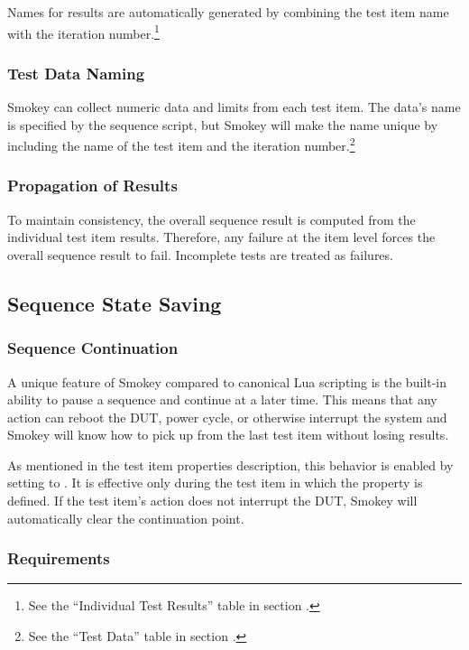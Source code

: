 Names for results are automatically generated by combining the test item name
with the iteration number.\footnote{See the ``Individual Test Results'' table
in section .}

\subsubsection{Test Data Naming}

Smokey can collect numeric data and limits from each test item.  The data's
name is specified by the sequence script, but Smokey will make the name unique
by including the name of the test item and the iteration number.\footnote{See
the ``Test Data'' table in section .}

\subsubsection{Propagation of Results}

To maintain consistency, the overall sequence result is computed from the
individual test item results.  Therefore, any failure at the item level forces
the overall sequence result to fail.  Incomplete tests are treated as
failures.

\subsection{Sequence State Saving}

\subsubsection{Sequence Continuation}

A unique feature of Smokey compared to canonical Lua scripting is the built-in
ability to pause a sequence and continue at a later time.  This means that any
action can reboot the DUT, power cycle, or otherwise interrupt the system and
Smokey will know how to pick up from the last test item without losing results.

As mentioned in the test item properties description, this behavior is enabled
by setting  to .  It is effective
only during the test item in which the property is defined.  If the test item's
action does not interrupt the DUT, Smokey will automatically clear the
continuation point.

\subsubsection{Requirements}

